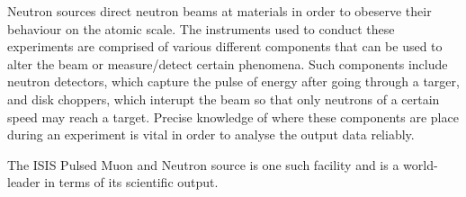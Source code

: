 Neutron sources direct neutron beams at materials in order to obeserve their behaviour on the atomic scale. The instruments used to conduct these experiments are comprised of various different components that can be used to alter the beam or measure/detect certain phenomena. Such components include neutron detectors, which capture the pulse of energy after going through a targer, and disk choppers, which interupt the beam so that only neutrons of a certain speed may reach a target. Precise knowledge of where these components are place during an experiment is vital in order to analyse the output data reliably. 

The ISIS Pulsed Muon and Neutron source is one such facility and is a world-leader in terms of its scientific output.
